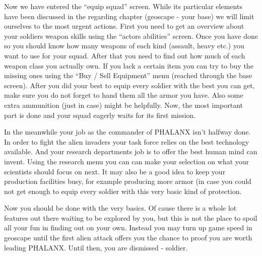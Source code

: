 Now we have entered the ``equip squad'' screen. While its particular elements have been discussed in the regarding chapter (geoscape - your base) we will limit ourselves to the most urgent actions. First you need to get an overview about your soldiers weapon skills using the ``actors abilities'' screen. Once you have done so you should know how many weapons of each kind (assault, heavy etc.) you want to use for your squad. After that you need to find out how much of each weapon class you actually own. If you lack a certain item you can try to buy the missing ones using the ``Buy / Sell Equipment'' menu (reached through the base screen). After you did your best to equip every soldier with the best you can get, make sure you do not forget to hand them all the armor you have. Also some extra ammunition (just in case) might be helpfully. Now, the most important part is done and your squad eagerly waits for its first mission.

In the meanwhile your job as the commander of PHALANX isn't halfway done. In order to fight the alien invaders your task force relies on the best technology available. And your research departments job is to offer the best human mind can invent. Using the research menu you can can make your selection on what your scientists should focus on next. It may also be a good idea to keep your production facilities busy, for example producing more armor (in case you could not get enough to equip every soldier with this very basic kind of protection.

Now you should be done with the very basics. Of cause there is a whole lot features out there waiting to be explored by you, but this is not the place to spoil all your fun in finding out on your own. Instead you may turn up game speed in geoscape until the first alien attack offers you the chance to proof you are worth leading PHALANX. Until then, you are dismissed - soldier.

